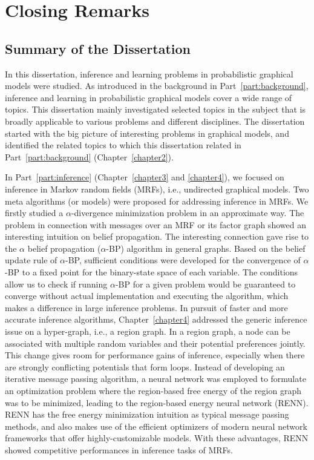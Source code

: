 \chapter{Closing Remarks}
\label{chapter9}

\section{Summary of the Dissertation}
In this dissertation, inference and learning problems in probabilistic graphical models were studied. As introduced in the background in Part~\ref{part:background}, inference and learning in probabilistic graphical models cover a wide range of topics. This dissertation mainly investigated selected topics in the subject that is broadly applicable to various problems and different disciplines. The dissertation started with the big picture of interesting problems in graphical models, and identified the related topics to which this dissertation related in Part~\ref{part:background} (Chapter~\ref{chapter2}).

In Part~\ref{part:inference} (Chapter~\ref{chapter3} and \ref{chapter4}), we focused on inference in Markov random fields (MRFs), i.e., undirected graphical models. Two meta algorithms (or models) were proposed for addressing inference in MRFs. We firstly studied a $\alpha$-divergence minimization problem in an approximate way. The problem in connection with messages over an MRF or its factor graph showed an interesting intuition on belief propagation. The interesting connection gave rise to the $\alpha$ belief propagation ($\alpha$-BP) algorithm in general graphs. Based on the belief update rule of $\alpha$-BP, sufficient conditions were developed for the convergence of $\alpha$-BP to a fixed point for the binary-state space of each variable. The conditions allow us to check if running $\alpha$-BP for a given problem would be guaranteed to converge without actual implementation and executing the algorithm, which makes a difference in large inference problems. In pursuit of faster and more accurate inference algorithms, Chapter~\ref{chapter4} addressed the generic inference issue on a hyper-graph, i.e., a region graph. In a region graph, a node can be associated with multiple random variables and their potential preferences jointly. This change gives room for performance gains of inference, especially when there are strongly conflicting potentials that form loops. Instead of developing an iterative message passing algorithm, a neural network was employed to formulate an optimization problem where the region-based free energy of the region graph was to be minimized, leading to the region-based energy neural network (RENN). RENN has the free energy minimization intuition as typical message passing methods, and also makes use of the efficient optimizers of modern neural network frameworks that offer highly-customizable models. With these advantages, RENN showed competitive performances in inference tasks of MRFs.

